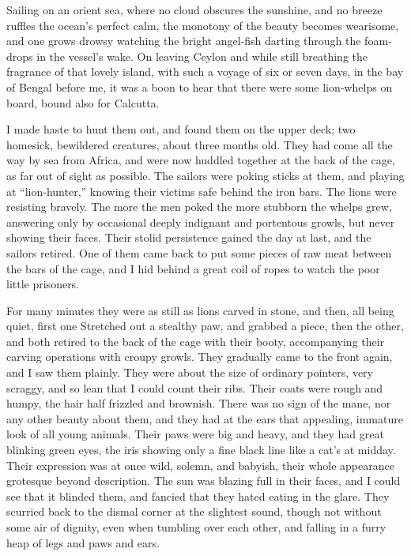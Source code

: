 \documentclass[12pt]{book}
\begin{document}
Sailing on an orient sea, where no cloud obscures the sunshine, and no breeze
ruffles the ocean’s perfect calm, the monotony of the beauty becomes wearisome, and one grows drowsy watching the bright angel‐fish darting through the
foam‐drops in the vessel’s wake. On leaving Ceylon and while still breathing the
fragrance of that lovely island, with such a voyage of six or seven days, in the
bay of Bengal before me, it was a boon to hear that there were some lion‐whelps
on board, bound also for Calcutta.

I made haste to hunt them out, and found them on the upper deck; two
homesick, bewildered creatures, about three months old. They had come all the
way by sea from Africa, and were now huddled together at the back of the cage,
as far out of sight as possible. The sailors were poking sticks at them, and playing
at “lion‐hunter,” knowing their victims safe behind the iron bars. The lions were
resisting bravely. The more the men poked the more stubborn the whelps grew,
answering only by occasional deeply indignant and portentous growls, but never
showing their faces. Their stolid persistence gained the day at last, and the sailors
retired. One of them came back to put some pieces of raw meat between the
bars of the cage, and I hid behind a great coil of ropes to watch the poor little
prisoners.

For many minutes they were as still as lions carved in stone, and then, all
being quiet, first one Stretched out a stealthy paw, and grabbed a piece, then the
other, and both retired to the back of the cage with their booty, accompanying
their carving operations with croupy growls. They gradually came to the front
again, and I saw them plainly. They were about the size of ordinary pointers, very
scraggy, and so lean that I could count their ribs. Their coats were rough and
humpy, the hair half frizzled and brownish. There was no sign of the mane, nor
any other beauty about them, and they had at the ears that appealing, immature
look of all young animals. Their paws were big and heavy, and they had great
blinking green eyes, the iris showing only a fine black line like a cat’s at midday.
Their expression was at once wild, solemn, and babyish, their whole appearance
grotesque beyond description. The sun was blazing full in their faces, and I could
see that it blinded them, and fancied that they hated eating in the glare. They
scurried back to the dismal corner at the slightest sound, though not without
some air of dignity, even when tumbling over each other, and falling in a furry
heap of legs and paws and ears.
\end{document}
